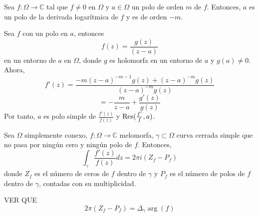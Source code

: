\begin{prop}
  Sea $f : \Omega \to \mathbb{C}$ tal que $f \neq 0$ en $\Omega$ y $a \in \Omega$ un polo de orden $m$ de $f$. Entonces, $a$ es un polo de la derivada logarítmica de $f$ y es de orden $-m$.
\end{prop}

\begin{dem}
  Sea $f$ con un polo en $a$, entonces
  \[ 
    f(z) = \frac{g(z)}{(z - a)} 
  \] 
  en un entorno de $a$ en $\Omega$, donde $g$ es holomorfa en un entorno de $a$ y $g(a) \neq 0$. Ahora, 
  \[ 
    f'(z) = \frac{-m(z - a)^{-m-1} g(z) + (z - a)^{-m} g(z)}{(z - a)^{-m}g(z)} 
  \] 
  \[ 
    = - \frac{m}{z - a} + \frac{g'(z)}{g(z)}
  \] 
  Por tanto, $a$ es polo simple de $\frac{f'(z)}{f(z)}$ y $\operatorname{Res}(\frac{f'}{f}, a)$.
\end{dem}

\begin{theo}
  Sea $\Omega$ simplemente conexo, $f : \Omega \to \mathbb{C}$ melomorfa, $\gamma \subset \Omega$ curva cerrada simple que no pasa por ningún cero y ningún polo de $f$. Entonces,
  \[ 
    \int_{\gamma}^{} \frac{f'(z)}{f(z)} dz = 2 \pi i  (Z_{f} - P_{f})
  \]
  donde $Z_{f}$ es el número de ceros de $f$ dentro de $\gamma$ y $P_{f}$ es el número de polos de $f$ dentro de $\gamma$, contadas con su multiplicidad.
\end{theo}

\begin{note}
  VER QUE
  \[
    2 \pi (Z_{f} - P_{f}) = \Delta_{\gamma} \arg(f)
  \]
\end{note}
